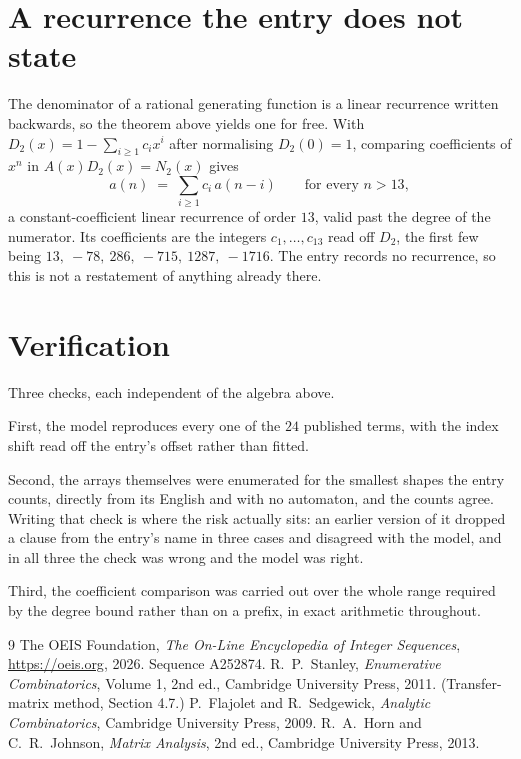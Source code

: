 \documentclass[11pt,a4paper]{article}
\theoremstyle{plain}
\theoremstyle{definition}
\begin{document}
\section{A recurrence the entry does not state}

The denominator of a rational generating function is a linear recurrence written backwards, so
the theorem above yields one for free. With $D_2(x)=1-\sum_{i\ge1}c_ix^i$ after normalising
$D_2(0)=1$, comparing coefficients of $x^n$ in $A(x)D_2(x)=N_2(x)$ gives
\[
a(n)\;=\;\sum_{i\ge1}c_i\,a(n-i)\qquad\text{for every }n>13,
\]
a constant-coefficient linear recurrence of order $13$, valid past the degree of the
numerator. Its coefficients are the integers $c_1,\dots,c_{13}$ read off $D_2$, the first few being $13,\ -78,\ 286,\ -715,\ 1287,\ -1716$. The entry records no recurrence, so this is not a restatement of anything
already there.

\section{Verification}

Three checks, each independent of the algebra above.

First, the model reproduces every one of the $24$ published terms, with the index shift
read off the entry's offset rather than fitted.

Second, the arrays themselves were enumerated for the smallest shapes the entry counts,
directly from its English and with no automaton, and the counts agree. Writing that check is
where the risk actually sits: an earlier version of it dropped a clause from the entry's name
in three cases and disagreed with the model, and in all three the check was wrong and the model
was right.

Third, the coefficient comparison was carried out over the whole range required by the degree
bound rather than on a prefix, in exact arithmetic throughout.

\begin{thebibliography}{9}
 The OEIS Foundation, \emph{The On-Line Encyclopedia of Integer
Sequences}, \url{https://oeis.org}, 2026. Sequence A252874.
 R.~P.~Stanley, \emph{Enumerative Combinatorics}, Volume 1, 2nd ed.,
Cambridge University Press, 2011. (Transfer-matrix method, Section 4.7.)
 P.~Flajolet and R.~Sedgewick, \emph{Analytic Combinatorics}, Cambridge
University Press, 2009.
 R.~A.~Horn and C.~R.~Johnson, \emph{Matrix Analysis}, 2nd ed., Cambridge
University Press, 2013.
\end{thebibliography}
\end{document}
